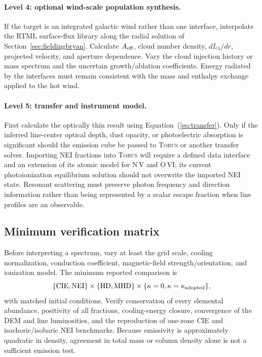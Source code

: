 \documentclass[english,a4paper]{my_memo2}
\begin{document}
\paragraph{Level 4: optional wind-scale population synthesis.}
If the target is an integrated galactic wind rather than one interface,
interpolate the RTML surface-flux library along the radial solution of
Section~\ref{sec:fieldingbryan}.  Calculate $A_{\rm eff}$, cloud number
density, $dL_\lambda/dr$, projected velocity, and aperture dependence.
Vary the cloud injection history or mass spectrum and the uncertain
growth/ablation coefficients.  Energy radiated by the interfaces must remain
consistent with the mass and enthalpy exchange applied to the hot wind.

\paragraph{Level 5: transfer and instrument model.}
First calculate the optically thin result using
Equation~(\ref{eq:transfer}).  Only if the inferred line-center optical depth,
dust opacity, or photoelectric absorption is significant should the emission
cube be passed to \textsc{Torus} or another transfer solver.  Importing NEI
fractions into \textsc{Torus} will require a defined data interface and an
extension of its atomic model for N\,V and O\,VI; its current photoionization
equilibrium solution should not overwrite the imported NEI state.  Resonant
scattering must preserve photon frequency and direction information rather
than being represented by a scalar escape fraction when line profiles are an
observable.

\subsection{Minimum verification matrix}

Before interpreting a spectrum, vary at least the grid scale, cooling
normalization, conduction coefficient, magnetic-field strength/orientation,
and ionization model.  The minimum reported comparison is
\[
 \{\mathrm{CIE},\mathrm{NEI}\}\times
 \{\mathrm{HD},\mathrm{MHD}\}\times
 \{\kappa=0,\kappa=\kappa_{\rm adopted}\},
\]
with matched initial conditions.  Verify conservation of every elemental
abundance, positivity of all fractions, cooling-energy closure, convergence
of the DEM and line luminosities, and the reproduction of one-zone CIE and
isochoric/isobaric NEI benchmarks.  Because emissivity is approximately
quadratic in density, agreement in total mass or column density alone is not
a sufficient emission test.
\end{document}
